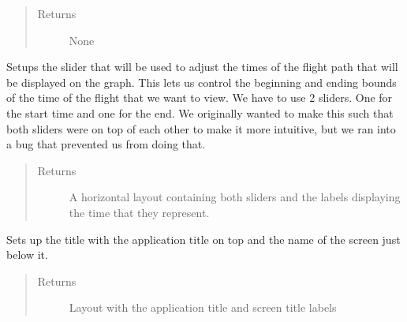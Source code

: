 \documentclass[letterpaper,10pt,english]{sphinxmanual}
\begin{document}
\begin{fulllineitems}
\begin{fulllineitems}
\begin{quote}
\begin{description}
\begin{itemize}
\end{itemize}

\item[{Returns}] \leavevmode
None

\end{description}\end{quote}

\end{fulllineitems}


\begin{fulllineitems}
\label{\detokenize{index:src.Views.View_ReportScreen.ReportWindow.setupSlider}}
Setups the slider that will be used to adjust the times of the flight path that will be displayed
on the graph. This lets us control the beginning and ending bounds of the time of the flight
that we want to view. We have to use 2 sliders. One for the start time and one for the end.
We originally wanted to make this such that both sliders were on top of each other to make
it more intuitive, but we ran into a bug that prevented us from doing that.
\begin{quote}\begin{description}
\item[{Returns}] \leavevmode
A horizontal layout containing both sliders and the labels displaying the time that they represent.

\end{description}\end{quote}

\end{fulllineitems}


\begin{fulllineitems}
\label{\detokenize{index:src.Views.View_ReportScreen.ReportWindow.setupTitle}}
Sets up the title with the application title on top and the name of the screen just below it.
\begin{quote}\begin{description}
\item[{Returns}] \leavevmode
Layout with the application title and screen title labels


\end{description}
\end{quote}
\end{fulllineitems}
\end{fulllineitems}
\end{document}
